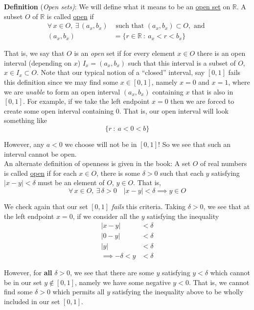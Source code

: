 \documentclass[12pt]{article}
\newlength\tindent
\renewcommand{\indent}{\hspace*{\tindent}}
\newcommand{\R}{\mathbb R}
\begin{document}
%
%
{\bf Definition} {(\em Open sets)}: We will define what it means to be an \underline{open set} on $\R$. A subset $O$ of $\R$ is called \underline{open} if 
\begin{align*}
	\forall\,x\in O,~\exists\,(a_x, b_x) &\text{ such that } (a_x, b_x) \subset O, \text{ and } \\
	(a_x, b_x) &= \{r \in \R ~:~ a_x < r < b_x \}
\end{align*}

\indent That is, we say that $O$ is an {\em open} set if for every element $x \in O$ there is an open interval (depending on $x$) $I_x = (a_x, b_x)$ such that this interval is a subset of $O$, $x \in I_x \subset O$. Note that our typical notion of a ``closed'' interval, say $[0, 1]$ fails this definition since we may find some $x \in [0,1]$, namely $x = 0$ and $x = 1$, where we are {\em unable} to form an open interval $(a_x, b_x)$ containing $x$ that is also in $[0, 1]$. For example, if we take the left endpoint $x = 0$ then we are forced to create some open interval containing $0$. That is, our open interval will look something like
\begin{equation*}
	\{r~:~a < 0 < b\}
\end{equation*}

\indent However, any $a < 0$ we choose will not be in $[0, 1]$! So we see that such an interval cannot be open. \\

\indent An alternate definition of openness is given in the book: A set $O$ of real numbers is called \underline{open} if for each $x \in O$, there is some $\delta > 0$ such that each $y$ satisfying $|x - y| < \delta$ must be an element of $O$, $y \in O$. That is,
\begin{equation*}
	\forall\,x\in O,~\exists\,\delta > 0 \quad |x - y| < \delta \implies y \in O
\end{equation*}

\indent We check again that our set $[0, 1]$ {\em fails} this criteria. Taking $\delta > 0$, we see that at the left endpoint $x = 0$, if we consider all the $y$ satisfying the inequality
\begin{align*}
	|x - y| &< \delta \\
	|0 - y| &< \delta \\
	|y| &< \delta \\
	\implies -\delta < y &< \delta
\end{align*}

\indent However, for {\bf all} $\delta > 0$, we see that there are some $y$ satisfying $y < \delta$ which cannot be in our set $y \notin [0, 1]$, namely we have some negative $y < 0$. That is, we cannot find some $\delta > 0$ which permits all $y$ satisfying the inequality above to be wholly included in our set $[0, 1]$. \\
\end{document}
